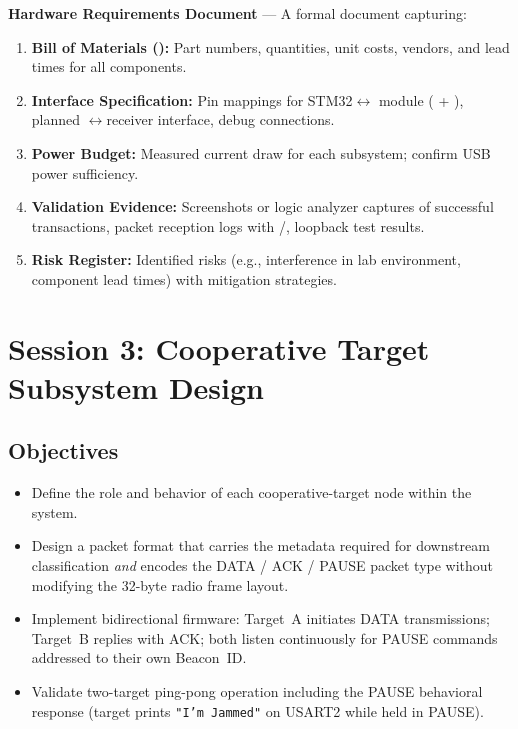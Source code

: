 \documentclass[11pt,letterpaper]{article}
\begin{document}
	\begin{tcolorbox}[deliverable={Session 2 Deliverable}]
		\textbf{Hardware Requirements Document} --- A formal document capturing:
		\begin{enumerate}
			\item \textbf{Bill of Materials (\BOM{}):} Part numbers, quantities, unit costs, vendors, and lead times for all components.
			\item \textbf{Interface Specification:} Pin mappings for STM32$\leftrightarrow$\RF{} module (\SPI{} + \GPIO{}), planned \FPGA{}$\leftrightarrow$receiver interface, \UART{} debug connections.
			\item \textbf{Power Budget:} Measured current draw for each subsystem; confirm USB power sufficiency.
			\item \textbf{Validation Evidence:} Screenshots or logic analyzer captures of successful \SPI{} transactions, packet reception logs with \RSSI{}/\SNR{}, \FPGA{} loopback test results.
			\item \textbf{Risk Register:} Identified risks (e.g., \RF{} interference in lab environment, component lead times) with mitigation strategies.
		\end{enumerate}
	\end{tcolorbox}
	
	\newpage
	\section{Session 3: Cooperative Target Subsystem Design}
	\label{sec:beacon}

	\subsection{Objectives}

	\begin{itemize}[leftmargin=2em]
		\item Define the role and behavior of each cooperative-target node within the system.
		\item Design a packet format that carries the metadata required for downstream classification \emph{and} encodes the DATA / ACK / PAUSE packet type without modifying the 32-byte radio frame layout.
		\item Implement bidirectional firmware: Target~A initiates DATA transmissions; Target~B replies with ACK; both listen continuously for PAUSE commands addressed to their own Beacon~ID.
		\item Validate two-target ping-pong operation including the PAUSE behavioral response (target prints \texttt{"I'm Jammed"} on USART2 while held in PAUSE).
	\end{itemize}
\end{document}
